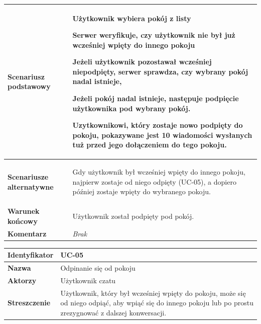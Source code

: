 {\begin{tabular}{ | l | l | }
	\hline
		\textbf{Scenariusz podstawowy} & \parbox[t]{11cm}{
			\begin{enumreq}
				\item Użytkownik wybiera pokój z listy
				\item Serwer weryfikuje, czy użytkownik nie był już wcześniej wpięty do
				innego pokoju
				\item Jeżeli użytkownik pozostawał wcześniej niepodpięty, serwer
				sprawdza, czy wybrany pokój nadal istnieje,
				\item Jeżeli pokój nadal istnieje, następuje podpięcie użytkownika pod
				wybrany pokój.
				\item Uzytkownikowi, który zostaje nowo podpięty do pokoju,	pokazywane
				jest 10 wiadomości wysłanych tuż przed jego dołączeniem do tego pokoju.
			\end{enumreq}
		}
		\\

	\hline
		\textbf{Scenariusze alternatywne} & \parbox[t]
		{11cm}{
			\begin{enumreq}
				\item Gdy użytkownik był wcześniej wpięty do innego pokoju,	najpierw
				zostaje od niego odpięty (UC-05), a dopiero później zostaje wpięty do
				wybranego pokoju.
			\end{enumreq}
		}
		\\

	\hline
		\textbf{Warunek końcowy} & \parbox[t]{11cm}{
			Użytkownik został podpięty pod pokój.
		}
		\\

	\hline
		\textbf{Komentarz} & \parbox[t]{11cm}{
			\textit{Brak}
		}
		\\

	\hline
\end{tabular}

\vspace{2em}

\begin{tabular}{ | l | l | }
	\hline
		\textbf{Identyfikator} &
		UC-05
		\\

	\hline
		\textbf{Nazwa} &
		Odpinanie się od pokoju
		\\

	\hline
		\textbf{Aktorzy} & \parbox[t]{11cm}{
			Użytkownik czatu
		}\\

	\hline
		\textbf{Streszczenie} & \parbox[t]{11cm}{
			Użytkownik, który był wcześniej wpięty do pokoju, może się od niego
			odpiąć, aby wpiąć się do innego pokoju lub po prostu zrezygnować z dalszej
			konwersacji.
		}\\


\end{tabular}}
